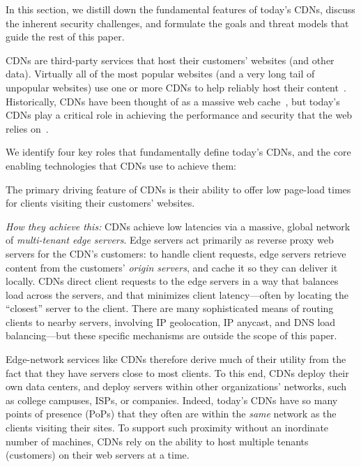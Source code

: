 
In this section, we distill down the fundamental features of today's
CDNs, discuss the inherent security challenges, and formulate the goals
and threat models that guide the rest of this paper.

CDNs are third-party services that host their customers' websites (and
other data).
%
Virtually all of the most popular websites (and a very long tail of
unpopular websites) use one or more CDNs to help reliably host their
content~\cite{key-sharing}.
%
Historically, CDNs have been thought of as a massive web
cache~\cite{cdn-on-demand}, but today's CDNs play a critical role in
achieving the performance and security that the web relies
on~\cite{securing-cdns}.


We identify four key roles that fundamentally define today's CDNs, and
the core enabling technologies that CDNs use to achieve them:

%
The primary driving feature of CDNs is their ability to offer low
page-load times for clients visiting their customers' websites.
	
\medskip\noindent
%
\emph{How they achieve this:}
%
CDNs achieve low latencies via a massive, global network of
\emph{multi-tenant edge servers}.
%
Edge servers act primarily as reverse proxy web servers for the CDN's
customers: to handle client requests, edge servers retrieve content
from the customers' \emph{origin servers}, and cache it so they can
deliver it locally.
%
CDNs direct client requests to the edge servers in a way that balances
load across the servers, and that minimizes client latency---often by
locating the ``closest'' server to the client.
%
There are many sophisticated means of routing clients to nearby
servers, involving IP geolocation, IP anycast, and DNS load
balancing---but these specific mechanisms are outside the scope of this
paper.


Edge-network services like CDNs therefore derive much of their utility
from the fact that they have servers close to most clients.
%
To this end, CDNs deploy their own data centers, and deploy servers
within other organizations' networks, such as college campuses, ISPs,
or companies.
%
Indeed, today's CDNs have so many points of presence (PoPs) that they
often are within the \emph{same} network as the clients visiting their
sites.
%
To support such proximity without an inordinate number of machines,
CDNs rely on the ability to host multiple tenants (customers) on
their web servers at a time.


